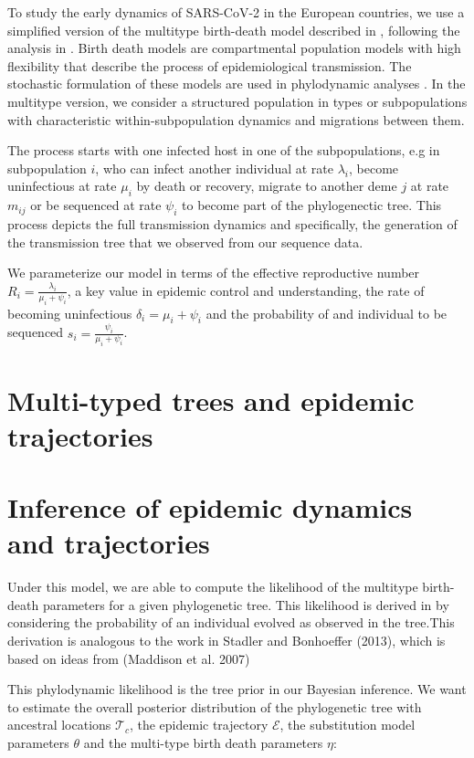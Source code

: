 To study the early dynamics of SARS-CoV-2 in the European countries, we use a simplified version of the multitype birth-death model described in \cite{Kuhnert2016}, following the analysis in \cite{Nadeau2020}. Birth death models are compartmental population models with high flexibility that describe the process of epidemiological transmission. The stochastic formulation of these models are used in phylodynamic analyses \cite{Stadler2012}. In the multitype version, we consider a structured population in types or subpopulations with characteristic within-subpopulation dynamics and migrations between them.

The process starts with one infected host in one of the subpopulations, e.g in subpopulation $i$, who can infect another individual at rate $\lambda_i$, become uninfectious at rate $\mu_i$ by death or recovery, migrate to another deme $j$ at rate $m_{ij}$ or be sequenced at rate $\psi_i$ to become part of the phylogenectic tree. This process depicts the full transmission dynamics and specifically, the generation of the transmission tree that we observed from our sequence data. 

We parameterize our model in terms of the effective reproductive number $R_i = \frac{\lambda_i}{\mu_i + \psi_i}$, a key value in epidemic control and understanding, the rate of becoming uninfectious $\delta_i = \mu_i + \psi_i$ and the probability of and individual to be sequenced $s_i = \frac{\psi_i}{\mu_i + \psi_i}$.


\section{Multi-typed trees and epidemic trajectories}


\section{Inference of epidemic dynamics and trajectories}

Under this model, we are able to compute the likelihood of the multitype birth-death parameters for a given phylogenetic tree. This likelihood is derived in \cite{Kuhnert} by considering the probability of an individual evolved as observed in the tree.This derivation is analogous to the work in Stadler and Bonhoeffer (2013), which is based on ideas from (Maddison et al. 2007)

This phylodynamic likelihood is the tree prior in our Bayesian inference. We want to estimate the overall posterior distribution of the phylogenetic tree with ancestral locations $\mathcal{T}_c$, the epidemic trajectory $\mathcal{E}$, the substitution model parameters $\theta$ and the multi-type birth death parameters $\eta$:

